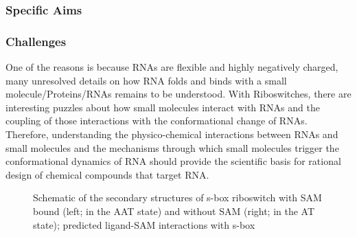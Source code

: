 \documentclass[a4paper,10pt]{article}
\begin{document}
\subsubsection*{Specific Aims}



\subsubsection*{Challenges}

One of the reasons is because 
RNAs are flexible and highly negatively charged, many unresolved details on how RNA folds and binds with a small molecule/Proteins/RNAs remains to be understood.  With Riboswitches, there are interesting puzzles about how small molecules 
interact with RNAs and the coupling of those interactions with the conformational change of RNAs. 
Therefore, understanding the physico-chemical interactions between RNAs and small molecules and
the mechanisms through which small molecules trigger the conformational dynamics of RNA should 
provide the scientific basis for rational design of chemical compounds that target RNA.

\begin{figure}
   \hspace{0.05in}
\caption{Schematic of the secondary structures of s-box riboswitch with SAM bound (left; in the AAT state) and without SAM 
(right; in the AT state); predicted ligand-SAM interactions with s-box}
\end{figure}
\end{document}
